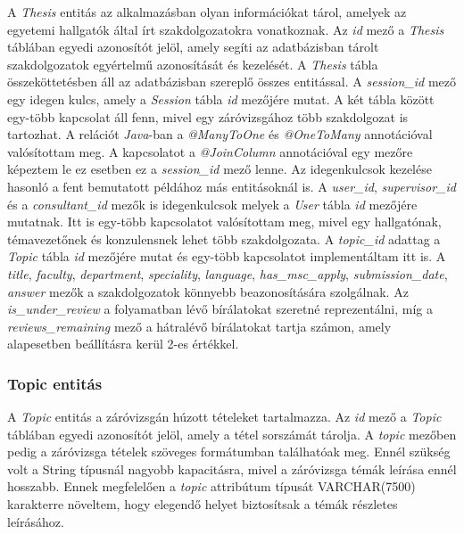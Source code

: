 A \textit{Thesis} entitás az alkalmazásban olyan információkat tárol, amelyek az egyetemi hallgatók által írt szakdolgozatokra vonatkoznak. Az \textit{id} mező a \textit{Thesis} táblában egyedi azonosítót jelöl, amely segíti az adatbázisban tárolt szakdolgozatok egyértelmű azonosítását és kezelését. A \textit{Thesis} tábla összeköttetésben áll az adatbázisban szereplő összes entitással. A \textit{session\_id} mező egy idegen kulcs, amely a \textit{Session} tábla \textit{id} mezőjére mutat. A két tábla között egy-több kapcsolat áll fenn, mivel egy záróvizsgához több szakdolgozat is tartozhat. A relációt \textit{Java}-ban \cite{Java} a \textit{@ManyToOne} és \textit{@OneToMany} annotációval valósítottam meg. A kapcsolatot a \textit{@JoinColumn} annotációval egy mezőre képeztem le ez esetben ez a \textit{session\_id} mező lenne. Az idegenkulcsok kezelése hasonló a fent bemutatott példához más entitásoknál is. A \textit{user\_id}, \textit{supervisor\_id} és a \textit{consultant\_id} mezők is idegenkulcsok melyek a \textit{User} tábla \textit{id} mezőjére mutatnak. Itt is egy-több kapcsolatot valósítottam meg, mivel egy hallgatónak, témavezetőnek és konzulensnek lehet több szakdolgozata. A \textit{topic\_id} adattag a \textit{Topic} tábla \textit{id} mezőjére mutat és egy-több kapcsolatot implementáltam itt is. A \textit{title}, \textit{faculty}, \textit{department}, \textit{speciality}, \textit{language}, \textit{has\_msc\_apply}, \textit{submission\_date}, \textit{answer} mezők a szakdolgozatok könnyebb beazonosítására szolgálnak. Az \textit{is\_under\_review} a folyamatban lévő bírálatokat szeretné reprezentálni, míg a \textit{reviews\_remaining} mező a hátralévő bírálatokat tartja számon, amely alapesetben beállításra kerül 2-es értékkel.

\subsubsection{Topic entitás}

A \textit{Topic} entitás a záróvizsgán húzott tételeket tartalmazza. Az \textit{id} mező a \textit{Topic} táblában egyedi azonosítót jelöl, amely a tétel sorszámát tárolja. A \textit{topic} mezőben pedig a záróvizsga tételek szöveges formátumban találhatóak meg. Ennél szükség volt a String típusnál nagyobb kapacitásra, mivel a záróvizsga témák leírása ennél hosszabb. Ennek megfelelően a \textit{topic} attribútum típusát VARCHAR(7500) karakterre növeltem, hogy elegendő helyet biztosítsak a témák részletes leírásához.

